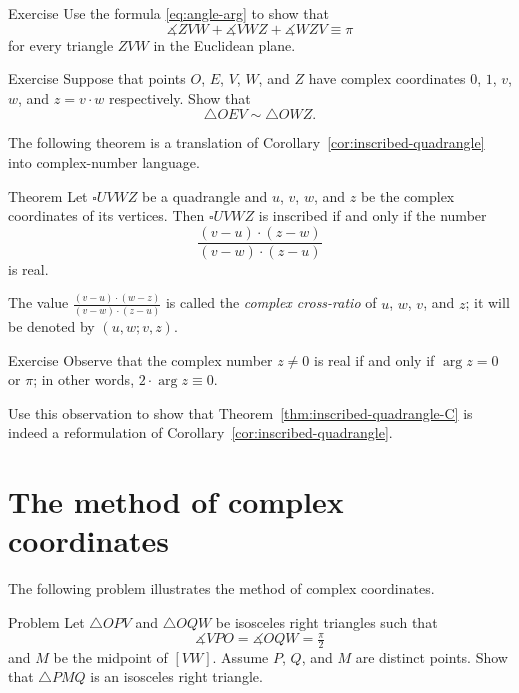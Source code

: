 \begin{thm}{Exercise}\label{ex:3-sum-C}
Use the formula \ref{eq:angle-arg} to show that  
$$\measuredangle ZVW+\measuredangle VWZ+\measuredangle WZV\equiv \pi$$
for every triangle $ZVW$ in the Euclidean plane.
\end{thm}

\begin{thm}{Exercise}\label{ex:C-sim}
Suppose that points $O$, $E$, $V$, $W$, and $Z$ have complex coordinates $0$, $1$, $v$, $w$, and $z=v\cdot w$ respectively.
Show that 
\[\triangle OEV\sim \triangle OWZ.\]

\end{thm}

The following theorem is a translation of Corollary~\ref{cor:inscribed-quadrangle} into complex-number language.

\begin{thm}{Theorem}\label{thm:inscribed-quadrangle-C}
Let $\square UVWZ$ be a quadrangle and $u$, $v$, $w$, and $z$ be the complex coordinates of its vertices. 
Then $\square UVWZ$ is inscribed 
if and only if the number
$$\frac{(v-u)\cdot(z-w)}{(v-w)\cdot(z-u)}$$ 
is real.
\end{thm}

The value $\frac{(v-u)\cdot(w-z)}{(v-w)\cdot(z-u)}$ is called the 
\emph{complex cross-ratio} of $u$, $w$, $v$, and $z$; 
it will be denoted by $(u,w;v,z)$.



\begin{thm}{Exercise}\label{ex:real-cross-ratio}
Observe that the complex number $z\ne 0$ is real if and only if $\arg z=0$ or $\pi$;
in other words, $2\cdot\arg z\equiv 0$.

Use this observation to show that Theorem~\ref{thm:inscribed-quadrangle-C}
is indeed a reformulation of Corollary~\ref{cor:inscribed-quadrangle}.
\end{thm}

\section{The method of complex coordinates}

The following problem illustrates the method of complex coordinates.

\begin{thm}{Problem}\label{prob:2right-tringles}
Let $\triangle OPV$ and $\triangle OQW$ be isosceles right triangles such that 
\[\measuredangle VPO=\measuredangle OQW=\tfrac\pi2\] 
and $M$ be the midpoint of $[VW]$.
Assume $P$, $Q$, and $M$ are distinct points.
Show that  $\triangle PMQ$ is an isosceles right triangle.
\end{thm}

